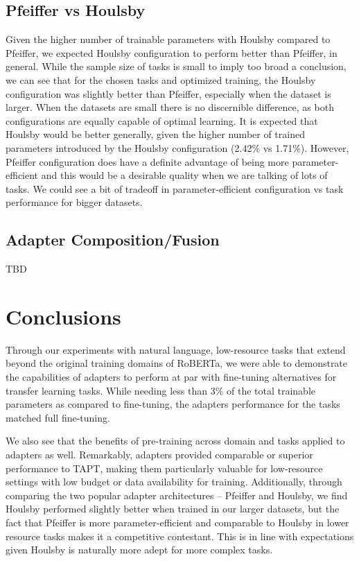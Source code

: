 \documentclass[10pt,twocolumn,letterpaper]{article}
\begin{document}
\subsection{Pfeiffer vs Houlsby} 
Given the higher number of trainable parameters with Houlsby compared to Pfeiffer, we expected Houlsby configuration to perform better than Pfeiffer, in general. While the sample size of tasks is small to imply too broad a conclusion, we can see that for the chosen tasks and optimized training, the Houlsby configuration was slightly better than Pfeiffer, especially when the dataset is larger. When the datasets are small there is no discernible difference, as both configurations are equally capable of optimal learning. It is expected that Houlsby would be better generally, given the higher number of trained parameters introduced by the Houlsby configuration (2.42\% vs 1.71\%). However, Pfeiffer configuration does have a definite advantage of being more parameter-efficient and this would be a desirable quality when we are talking of lots of tasks. We could see a bit of tradeoff in parameter-efficient configuration vs task performance for bigger datasets.

\subsection{Adapter Composition/Fusion}
TBD









\section{Conclusions}
Through our experiments with natural language, low-resource tasks that extend beyond the original training domains of RoBERTa, we were able to demonstrate the capabilities of adapters to perform at par with fine-tuning alternatives for transfer learning tasks. While needing less than 3\% of the total trainable parameters as compared to fine-tuning, the adapters performance for the tasks matched full fine-tuning.

We also see that the benefits of pre-training across domain and tasks applied to adapters as well. Remarkably, adapters provided comparable or superior performance to TAPT, making them particularly valuable for low-resource settings with low budget or data availability for training. Additionally, through comparing the two popular adapter architectures – Pfeiffer and Houlsby, we find Houlsby performed slightly better when trained in our larger datasets, but the fact that Pfeiffer is more parameter-efficient and comparable to Houlsby in lower resource tasks makes it a competitive contestant. This is in line with expectations given Houlsby is naturally more adept for more complex tasks.
\end{document}
